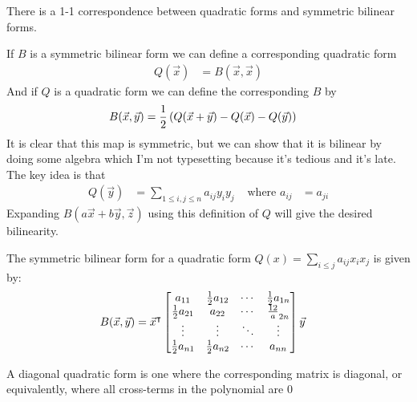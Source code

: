 \begin{remark}
  There is a 1-1 correspondence between quadratic forms and symmetric bilinear forms.

  If $B$ is a symmetric bilinear form we can define a corresponding quadratic form
    \begin{align}
      Q(\vec x) &= B(\vec x, \vec x)
    \end{align}
  And if $Q$ is a quadratic form we can define the corresponding $B$ by
    \begin{align}
      B(\vec x, \vec y) &= \frac12\left(Q(\vec x + \vec y) - Q(\vec x) - Q(\vec y)\right)
    \end{align}
  It is clear that this map is symmetric, but we can show that it is bilinear by doing some algebra which I'm not typesetting because it's tedious and it's late. The key idea is that
    \begin{align}
      Q(\vec y) &= \sum_{1 \le i,j \le n} a_{ij} y_iy_j & \text{ where } a_{ij}&=a_{ji}
    \end{align}
  Expanding $B(a\vec x + b\vec y, \vec z)$ using this definition of $Q$ will give the desired bilinearity.
\end{remark}
\begin{remark}
  The symmetric bilinear form for a quadratic form $Q(x) = \sum\limits_{i \le j} a_{ij} x_ix_j$ is given by:
    \begin{align}B(\vec x, \vec y) &= {\vec x}^{\intercal} \begin{bmatrix}
      a_{11} & \frac12a_{12} & \cdots & \frac12a_{1n} \\
      \frac12 a_{21} & a_{22} & \cdots & \frac{12}a_{2n} \\
      \vdots & \vdots & \ddots & \vdots \\
      \frac12 a_{n1} & \frac12 a_{n2} & \cdots & a_{nn}
    \end{bmatrix}\vec y\end{align}
\end{remark}
\begin{remark}
  A diagonal quadratic form is one where the corresponding matrix is diagonal, or equivalently, where all cross-terms in the polynomial are 0
\end{remark}
